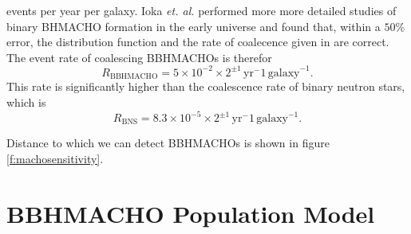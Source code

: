 events per year per galaxy. Ioka \emph{et. al.} performed more more detailed
studies of binary BHMACHO formation in the early universe\cite{Ioka:1998nz}
and found that, within a $50\%$ error, the distribution function and the rate
of coalecence given in \cite{Nakamura:1997sm} are correct. The event rate of
coalescing BBHMACHOs is therefor
\begin{equation}
R_\mathrm{BBHMACHO} = 5\times 10^{-2}\times 2^{\pm
1}\,\mathrm{yr}^-1\,\mathrm{galaxy}^{-1}.
\end{equation}
This rate is significantly higher than the coalescence rate of
binary neutron stars, which is
\begin{equation}
R_\mathrm{BNS} = 8.3\times 10^{-5}\times 2^{\pm
1}\,\mathrm{yr}^-1\,\mathrm{galaxy}^{-1}.
\end{equation}

Distance to which we can detect BBHMACHOs is shown in figure
\ref{f:machosensitivity}.

\section{BBHMACHO Population Model}
\label{s:bbhmachopopulation}


